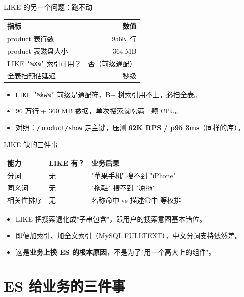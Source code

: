 \begin{frame}{LIKE 的另一个问题：跑不动}
\begin{tabular}{@{}lr@{}}
\toprule
指标 & 数值 \\
\midrule
product 表行数         & 956K 行 \\
product 表磁盘大小     & 364 MB \\
LIKE \texttt{'\%X\%'} 索引可用？ & 否（前缀通配） \\
全表扫预估延迟         & 秒级 \\
\bottomrule
\end{tabular}
\vspace{3mm}
\begin{itemize}
  \item \texttt{LIKE '\%kw\%'} 前缀是通配符，B+ 树索引用不上，必扫全表。
  \item 96 万行 + 360 MB 数据，单次搜索就吃满一颗 CPU。
  \item 对照：\texttt{/product/show} 走主键，压测 \textbf{62K RPS / p95 3ms}（同样的库）。
\end{itemize}
\end{frame}

\begin{frame}{LIKE 缺的三件事}
\begin{tabular}{@{}lll@{}}
\toprule
能力      & LIKE 有？ & 业务后果 \\
\midrule
分词       & 无 & "苹果手机" 搜不到 "iPhone" \\
同义词     & 无 & "拖鞋" 搜不到 "凉拖" \\
相关性排序 & 无 & 名称命中 vs 描述命中 等权排 \\
\bottomrule
\end{tabular}
\vspace{3mm}
\begin{itemize}
  \item LIKE 把搜索退化成"子串包含"，跟用户的搜索意图基本错位。
  \item 即便加索引、加全文索引（MySQL FULLTEXT），中文分词支持依然差。
  \item 这是\textbf{业务上换 ES 的根本原因}，不是为了"用一个高大上的组件"。
\end{itemize}
\end{frame}

\section{ES 给业务的三件事}

